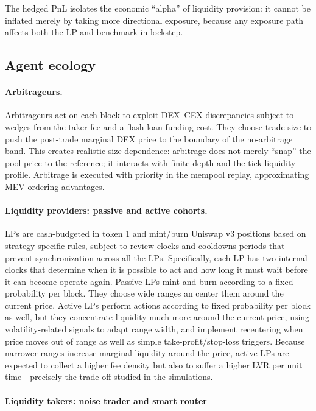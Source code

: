 \documentclass[11pt]{article}
\begin{document}
The hedged PnL isolates the economic “alpha” of liquidity provision: it cannot be inflated merely by taking more directional exposure, 
because any exposure path affects both the LP and benchmark in lockstep. 

\subsection{Agent ecology}

\paragraph{Arbitrageurs.}

Arbitrageurs act on each block to exploit DEX–CEX discrepancies subject to wedges from the taker fee and a flash-loan funding cost. They choose 
trade size to push the post-trade marginal DEX price to the boundary of the no-arbitrage band. This creates realistic size dependence: arbitrage 
does not merely “snap” the pool price to the reference; it interacts with finite depth and the tick liquidity profile. Arbitrage is executed with 
priority in the mempool replay, approximating MEV ordering advantages. 

\paragraph{Liquidity providers: passive and active cohorts.}

LPs are cash-budgeted in token 1 and mint/burn Uniswap v3 positions based on strategy-specific rules, subject to review 
clocks and cooldowns periods that prevent synchronization across all the LPs. Specifically, each LP has two internal 
clocks that determine when it is possible to act and how long it must wait before it can become operate again. Passive 
LPs mint and burn according to a fixed probability per block. They choose wide ranges an center them around the current 
price. Active LPs perform actions according to fixed probability per block as well, but they concentrate 
liquidity much more around the current price, using volatility-related signals to adapt range width, 
and implement recentering when price moves out of range as well as simple take-profit/stop-loss triggers. Because narrower 
ranges increase marginal liquidity around the price, active LPs are expected to collect a higher fee density but also to 
suffer a higher LVR per unit time—precisely the trade-off studied in the simulations. 

\paragraph{Liquidity takers: noise trader and smart router}
\end{document}
